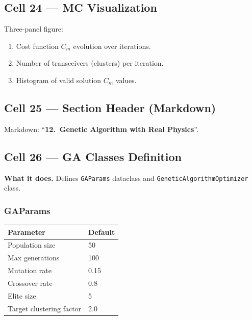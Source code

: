 \documentclass[11pt,a4paper]{article}
\begin{document}
\subsection{Cell 24 --- MC Visualization}

Three-panel figure:
\begin{enumerate}
    \item Cost function $C_m$ evolution over iterations.
    \item Number of transceivers (clusters) per iteration.
    \item Histogram of valid solution $C_m$ values.
\end{enumerate}

\subsection{Cell 25 --- Section Header (Markdown)}
Markdown: ``\textbf{12.\ Genetic Algorithm with Real Physics}''.

\subsection{Cell 26 --- GA Classes Definition}
\label{sec:cell26}

\textbf{What it does.}
Defines \texttt{GAParams} dataclass and \texttt{GeneticAlgorithmOptimizer} class.

\subsubsection{GAParams}
\begin{center}
\begin{tabular}{ll}
\toprule
\textbf{Parameter} & \textbf{Default} \\
\midrule
Population size & 50 \\
Max generations & 100 \\
Mutation rate & 0.15 \\
Crossover rate & 0.8 \\
Elite size & 5 \\
Target clustering factor & 2.0 \\
\bottomrule
\end{tabular}
\end{center}
\end{document}
